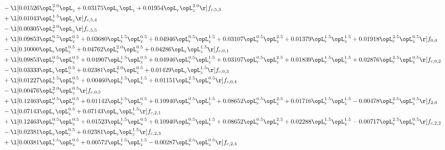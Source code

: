 \begin{alignat}{2}
& - \l[  0.01526 \opL_r^{2.0} \opL_z +  0.03175 \opL_r \opL_z +  0.01954 \opL_r \opL_z^{2.0}  \r] f_{c,5,3} \nonumber \\ 
& + \l[  0.01043 \opL_r^{1.5} \opL_z  \r] f_{c,5,4} \nonumber \\ 
& - \l[  0.00305 \opL_r^{2.0} \opL_z  \r] f_{c,5,5} \nonumber \\ 
& + \l[  0.09853 \opL_r^{0.5} \opL_z^{0.5} +  0.03680 \opL_r^{1.5} \opL_z^{0.5} +  0.04946 \opL_r^{0.5} \opL_z^{1.5} +  0.03107 \opL_r^{0.5} \opL_z^{2.5} +  0.01379 \opL_r^{1.5} \opL_z^{1.5} +  0.01918 \opL_r^{2.5} \opL_z^{0.5}  \r] f_{0,0} \nonumber \\ 
& - \l[  0.10000 \opL_r \opL_z^{0.5} +  0.04762 \opL_r^{2.0} \opL_z^{0.5} +  0.04286 \opL_r \opL_z^{1.5}  \r] f_{c,0,1} \nonumber \\ 
& + \l[  0.09853 \opL_r^{0.5} \opL_z^{0.5} +  0.04907 \opL_r^{1.5} \opL_z^{0.5} +  0.04946 \opL_r^{0.5} \opL_z^{1.5} +  0.03107 \opL_r^{0.5} \opL_z^{2.5} +  0.01839 \opL_r^{1.5} \opL_z^{1.5} +  0.02876 \opL_r^{2.5} \opL_z^{0.5}  \r] f_{c,0,2} \nonumber \\ 
& - \l[  0.03333 \opL_r \opL_z^{0.5} +  0.02381 \opL_r^{2.0} \opL_z^{0.5} +  0.01429 \opL_r \opL_z^{1.5}  \r] f_{c,0,3} \nonumber \\ 
& + \l[  0.01227 \opL_r^{1.5} \opL_z^{0.5} +  0.00460 \opL_r^{1.5} \opL_z^{1.5} +  0.01151 \opL_r^{2.5} \opL_z^{0.5}  \r] f_{c,0,4} \nonumber \\ 
& - \l[  0.00476 \opL_r^{2.0} \opL_z^{0.5}  \r] f_{c,0,5} \nonumber \\ 
& + \l[  0.12463 \opL_r^{0.5} \opL_z^{0.5} +  0.01142 \opL_r^{1.5} \opL_z^{0.5} +  0.10940 \opL_r^{0.5} \opL_z^{1.5} +  0.08652 \opL_r^{0.5} \opL_z^{2.5} +  0.01716 \opL_r^{1.5} \opL_z^{1.5}   -0.00478 \opL_r^{2.5} \opL_z^{0.5}  \r] f_{2,0} \nonumber \\ 
& - \l[  0.07143 \opL_r \opL_z^{0.5} +  0.07143 \opL_r \opL_z^{1.5}  \r] f_{c,2,1} \nonumber \\ 
& + \l[  0.12463 \opL_r^{0.5} \opL_z^{0.5} +  0.01523 \opL_r^{1.5} \opL_z^{0.5} +  0.10940 \opL_r^{0.5} \opL_z^{1.5} +  0.08652 \opL_r^{0.5} \opL_z^{2.5} +  0.02288 \opL_r^{1.5} \opL_z^{1.5}   -0.00717 \opL_r^{2.5} \opL_z^{0.5}  \r] f_{c,2,2} \nonumber \\ 
& - \l[  0.02381 \opL_r \opL_z^{0.5} +  0.02381 \opL_r \opL_z^{1.5}  \r] f_{c,2,3} \nonumber \\ 
& + \l[  0.00381 \opL_r^{1.5} \opL_z^{0.5} +  0.00572 \opL_r^{1.5} \opL_z^{1.5}   -0.00287 \opL_r^{2.5} \opL_z^{0.5}  \r] f_{c,2,4} \nonumber \\ 

\end{alignat}
